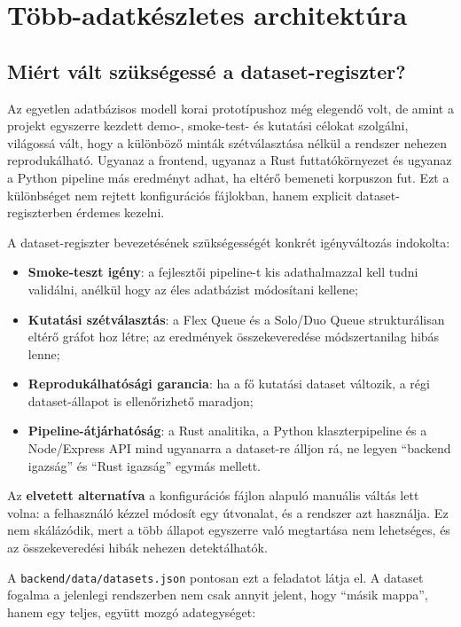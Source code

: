 \chapter{Több-adatkészletes architektúra}

\section{Miért vált szükségessé a dataset-regiszter?}

Az egyetlen adatbázisos modell korai prototípushoz még elegendő volt, de amint a projekt egyszerre kezdett demo-, smoke-test- és kutatási célokat szolgálni, világossá vált, hogy a különböző minták szétválasztása nélkül a rendszer nehezen reprodukálható. Ugyanaz a frontend, ugyanaz a Rust futtatókörnyezet és ugyanaz a Python pipeline más eredményt adhat, ha eltérő bemeneti korpuszon fut. Ezt a különbséget nem rejtett konfigurációs fájlokban, hanem explicit dataset-regiszterben érdemes kezelni.

A dataset-regiszter bevezetésének szükségességét konkrét igényváltozás indokolta:

\begin{itemize}
    \item \textbf{Smoke-teszt igény}: a fejlesztői pipeline-t kis adathalmazzal kell tudni validálni, anélkül hogy az éles adatbázist módosítani kellene;
    \item \textbf{Kutatási szétválasztás}: a Flex Queue és a Solo/Duo Queue strukturálisan eltérő gráfot hoz létre; az eredmények összekeveredése módszertanilag hibás lenne;
    \item \textbf{Reprodukálhatósági garancia}: ha a fő kutatási dataset változik, a régi dataset-állapot is ellenőrizhető maradjon;
    \item \textbf{Pipeline-átjárhatóság}: a Rust analitika, a Python klaszterpipeline és a Node/Express API mind ugyanarra a dataset-re álljon rá, ne legyen ``backend igazság'' és ``Rust igazság'' egymás mellett.
\end{itemize}

Az \textbf{elvetett alternatíva} a konfigurációs fájlon alapuló manuális váltás lett volna: a felhasználó kézzel módosít egy útvonalat, és a rendszer azt használja. Ez nem skálázódik, mert a több állapot egyszerre való megtartása nem lehetséges, és az összekeveredési hibák nehezen detektálhatók.

A \texttt{backend/data/datasets.json} pontosan ezt a feladatot látja el. A dataset fogalma a jelenlegi rendszerben nem csak annyit jelent, hogy ``másik mappa'', hanem egy teljes, együtt mozgó adategységet:

